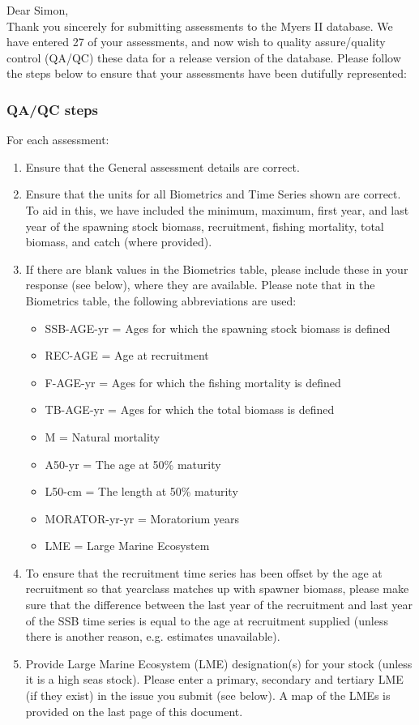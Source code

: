 \documentclass [a4paper, 10pt] {article}
\begin{document}
\noindent Dear Simon,\\

\noindent Thank you sincerely for submitting assessments to the Myers II database. We have entered 27 of your assessments, and now wish to quality assure/quality control (QA/QC) these data for a release version of the database. Please follow the steps below to ensure that your assessments have been dutifully represented:
\subsubsection{QA/QC steps}
For each assessment:
\begin{enumerate}
\item Ensure that the General assessment details are correct.
\item Ensure that the units for all Biometrics and Time Series shown are correct. To aid in this, we have included the minimum, maximum, first year, and last year of the spawning stock biomass, recruitment, fishing mortality, total biomass, and  catch  (where provided). 
\item If there are blank values in the Biometrics table, please include these in your response (see below), where they are available.
Please note that in the Biometrics table, the following abbreviations are used:
\begin{itemize}
\item SSB-AGE-yr  = Ages for which the spawning stock biomass is defined
\item REC-AGE     = Age at recruitment
\item F-AGE-yr    = Ages for which the fishing mortality is defined 
\item TB-AGE-yr   = Ages for which the total biomass is defined
\item M      = Natural mortality
\item A50-yr      = The age at 50\% maturity
\item L50-cm      = The length at 50\% maturity
\item MORATOR-yr-yr = Moratorium years
\item LME = Large Marine Ecosystem\\
\end{itemize}
\item To ensure that the recruitment time series has been offset by the age at recruitment so that yearclass matches up with spawner biomass, please make sure that the difference between the last year of the recruitment and last year of the SSB time series is equal to the age at recruitment supplied (unless there is another reason, e.g. estimates unavailable). 
\item Provide Large Marine Ecosystem (LME) designation(s) for your stock (unless it is a high seas stock). Please enter a primary, secondary and tertiary LME (if they exist) in the issue you submit (see below). A map of the LMEs is provided on the last page of this document. 
\end{enumerate}
\vspace{-.25in}
\end{document}
